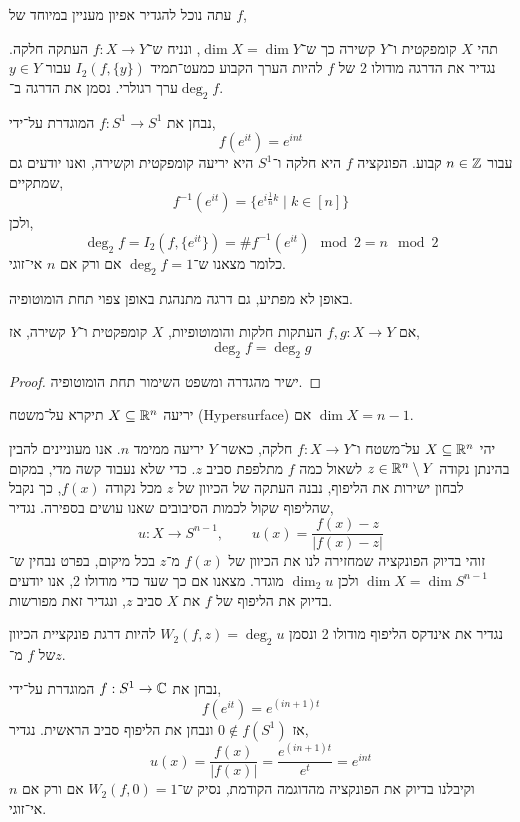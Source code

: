 עתה נוכל להגדיר אפיון מעניין במיוחד של $f$,
\begin{definition}
	תהי $X$ קומפקטית ו־$Y$ קשירה כך ש־$\dim X = \dim Y$, ונניח ש־$f : X \to Y$ העתקה חלקה.
	נגדיר את הדרגה מודולו 2 של $f$ להיות הערך הקבוע כמעט־תמיד $I_2(f, \{ y \})$ עבור $y \in Y$ ערך רגולרי.
	נסמן את הדרגה ב־$\deg_2 f$.
\end{definition}
\begin{example}
	נבחן את $f : S^1 \to S^1$ המוגדרת על־ידי,
	\[
		f(e^{i t})
		= e^{i n t}
	\]
	עבור $n \in \mathbb{Z}$ קבוע.
	הפונקציה $f$ היא חלקה ו־$S^1$ היא יריעה קומפקטית וקשירה, ואנו יודעים גם שמתקיים,
	\[
		f^{-1}(e^{i t})
		= \{ e^{i \frac{1}{n} k} \mid k \in [n] \}
	\]
	ולכן,
	\[
		\deg_2 f
		= I_2(f, \{ e^{i t} \})
		= \# f^{-1}(e^{i t}) \mod 2
		= n \mod 2
	\]
	כלומר מצאנו ש־$\deg_2 f = 1$ אם ורק אם $n$ אי־זוגי.
\end{example}
באופן לא מפתיע, גם דרגה מתנהגת באופן צפוי תחת הומוטופיה.
\begin{theorem}
	אם $f, g : X \to Y$ העתקות חלקות והומוטופיות, $X$ קומפקטית ו־$Y$ קשירה,
	אז,
	\[
		\deg_2 f = \deg_2 g
	\]
\end{theorem}
\begin{proof}
	ישיר מהגדרה ומשפט השימור תחת הומוטופיה.
\end{proof}
\begin{definition}[על־משטח]
	יריעה $X \subseteq \mathbb{R}^n$ תיקרא על־משטח (Hypersurface) אם $\dim X = n - 1$.
\end{definition}
יהי $X \subseteq \mathbb{R}^n$ על־משטח ו־$f : X \to Y$ חלקה, כאשר $Y$ יריעה ממימד $n$.
אנו מעוניינים להבין בהינתן נקודה $z \in \mathbb{R}^n \setminus Y$ לשאול כמה $f$ מתלפפת סביב $z$.
כדי שלא נעבוד קשה מדי, במקום לבחון ישירות את הליפוף, נבנה העתקה של הכיוון של $z$ מכל נקודה $f(x)$, כך נקבל שהליפוף שקול לכמות הסיבובים שאנו עושים בספירה.
נגדיר,
\[
	u : X \to S^{n - 1},
	\qquad
	u(x)
	= \frac{f(x) - z}{|f(x) - z|}
\]
זוהי בדיוק הפונקציה שמחזירה לנו את הכיוון של $f(x)$ מ־$z$ בכל מיקום, בפרט נבחין ש־$\dim X = \dim S^{n - 1}$ ולכן $\dim_2 u$ מוגדר.
מצאנו אם כך שעד כדי מודולו 2, אנו יודעים בדיוק את הליפוף של $f$ את $X$ סביב $z$, ונגדיר זאת מפורשות.
\begin{definition}
	נגדיר את אינדקס הליפוף מודולו 2 ונסמן $W_2(f, z) = \deg_2 u$ להיות דרגת פונקציית הכיוון של $f$ מ־$z$.
\end{definition}
\begin{example}
	נבחן את $f : S^1 \to \mathbb{C}$ המוגדרת על־ידי,
	\[
		f(e^{i t})
		= e^{(i n + 1) t}
	\]
	אז $0 \notin f(S^1)$ ונבחן את הליפוף סביב הראשית.
	נגדיר,
	\[
		u(x)
		= \frac{f(x)}{|f(x)|}
		= \frac{e^{(i n + 1) t}}{e^t}
		= e^{i n t}
	\]
	וקיבלנו בדיוק את הפונקציה מהדוגמה הקודמת, נסיק ש־$W_2(f, 0) = 1$ אם ורק אם $n$ אי־זוגי.
\end{example}

